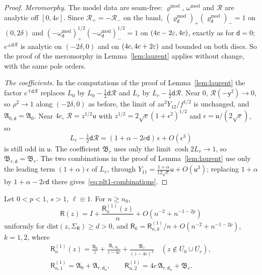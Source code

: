 \begin{proof}
\emph{Meromorphy.} The model data are seam-free: $\varrho^{\mathrm{mod}}$, $\omega^{\mathrm{mod}}$ and $\mathcal R$ are
analytic off $[0,4c]$. Since $\mathcal R_+=-\mathcal R_-$ on the band, $(\varrho^{\mathrm{mod}}_{\mathsf d})_+(\varrho^{\mathrm{mod}}_{\mathsf d})_-=1$
on $(0,2\delta)$ and $(-\omega^{\mathrm{mod}}_{\mathsf d})^{1/2}_+(-\omega^{\mathrm{mod}}_{\mathsf d})^{1/2}_-=1$ on $(4c-2\varepsilon,4c)$,
exactly as for $\mathsf d=0$; $e^{\pm\mathsf d\mathcal R}$ is analytic on $(-2\delta,0)$ and on $(4c,4c+2\varepsilon)$ and bounded on
both discs. So the proof of the meromorphy in Lemma~\ref{lem:laurent} applies without change, with the same pole orders.

\emph{The coefficients.} In the computations of the proof of Lemma~\ref{lem:laurent} the factor $e^{\mp\mathsf d\mathcal R}$
replaces $L_0$ by $L_0-\frac12\mathsf d\mathcal R$ and $L_r$ by $L_r-\frac12\mathsf d\mathcal R$. Near $0$,
$\mathcal R(-\mathsf y^2)\to0$, so $\rho^2\to1$ along $(-2\delta,0)$ as before, the limit of $za^2Y_{12}/f^{1/2}$ is unchanged,
and $\mathfrak A_{0,\mathsf d}=\mathfrak A_0$. Near $4c$, $\mathcal R=z^{1/2}\mathsf u$ with $z^{1/2}=2\sqrt c(1+\epsilon^2)^{1/2}$
and $\epsilon=\mathsf u/(2\sqrt c)$, so
\[
  L_r-\tfrac12\mathsf d\mathcal R=(1+\alpha-2c\mathsf d)\,\epsilon+O(\epsilon^3)
\]
is still odd in $\mathsf u$. The coefficient $\mathfrak B_r$ uses only the limit $\cosh2L_r\to1$, so
$\mathfrak B_{r,\mathsf d}=\mathfrak B_r$. The two combinations in the proof of Lemma~\ref{lem:laurent} use only the
leading term $(1+\alpha)\epsilon$ of $L_r$, through $Y_{11}=\frac{1+\alpha}{12\sqrt c}\mathsf u+O(\mathsf u^3)$; replacing
$1+\alpha$ by $1+\alpha-2c\mathsf d$ there gives~\eqref{eq:plt1-combinations}.
\end{proof}

\begin{proposition}\label{prop:plt1-second}
Let $0<p<1$, $s>1$, $\ell\equiv1$. For $n\ge n_0$,
\[
  \mathsf R(z)=I+\frac{\mathsf R^{(1)}_n(z)}n+O(n^{-2}+n^{-1-2p})
\]
uniformly for $\mathrm{dist}(z,\Sigma_{\mathsf R})\ge d>0$, and $\mathsf R_k=\mathsf R^{(1)}_{n,k}/n+O(n^{-2}+n^{-1-2p})$,
$k=1,2$, where
\begin{gather*}
  \mathsf R^{(1)}_n(z)=\frac{\mathfrak A_0}z+\frac{\mathfrak A_{r,\mathsf d_n}}{z-4c}+\frac{\mathfrak B_r}{(z-4c)^2}
  \quad(z\notin\overline{U_0}\cup\overline{U_r}),\\
  \mathsf R^{(1)}_{n,1}=\mathfrak A_0+\mathfrak A_{r,\mathsf d_n},\qquad \mathsf R^{(1)}_{n,2}=4c\,\mathfrak A_{r,\mathsf d_n}+\mathfrak B_r .
\end{gather*}
\end{proposition}

